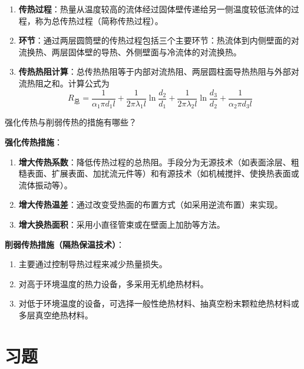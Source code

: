\begin{solution}
\begin{enumerate}
  \item \textbf{传热过程}：热量从温度较高的流体经过固体壁传递给另一侧温度较低流体的过程，称为总传热过程（简称传热过程）。
  \item \textbf{环节}：通过两层圆筒壁的传热过程包括三个主要环节：热流体到内侧壁面的对流换热、两层固体壁的导热、外侧壁面与冷流体的对流换热。
  \item \textbf{传热热阻计算}：总传热热阻等于内部对流热阻、两层圆柱面导热热阻与外部对流热阻之和。计算公式为
  \begin{equation*}
    R_{\text{总}} = \frac{1}{\alpha_{1}\pi d_{1}l} + \frac{1}{2\pi\lambda_{1}l}\ln\frac{d_{2}}{d_{1}} + \frac{1}{2\pi\lambda_{2}l}\ln\frac{d_{3}}{d_{2}} + \frac{1}{\alpha_{2}\pi d_{3}l}
  \end{equation*}
\end{enumerate}
\end{solution}

\begin{problem}
强化传热与削弱传热的措施有哪些？
\end{problem}

\begin{solution}
\textbf{强化传热措施}：
\begin{enumerate}
  \item \textbf{增大传热系数}：降低传热过程的总热阻。手段分为无源技术（如表面涂层、粗糙表面、扩展表面、加扰流元件等）和有源技术（如机械搅拌、使换热表面或流体振动等）。
  \item \textbf{增大传热温差}：通过改变受热面的布置方式（如采用逆流布置）来实现。
  \item \textbf{增大换热面积}：采用小直径管束或在壁面上加肋等方法。
\end{enumerate}

\textbf{削弱传热措施（隔热保温技术）}：
\begin{enumerate}
  \item 主要通过控制导热过程来减少热量损失。
  \item 对高于环境温度的热力设备，多采用无机绝热材料。
  \item 对低于环境温度的设备，可选择一般性绝热材料、抽真空粉末颗粒绝热材料或多层真空绝热材料。
\end{enumerate}
\end{solution}

\section{习题}

